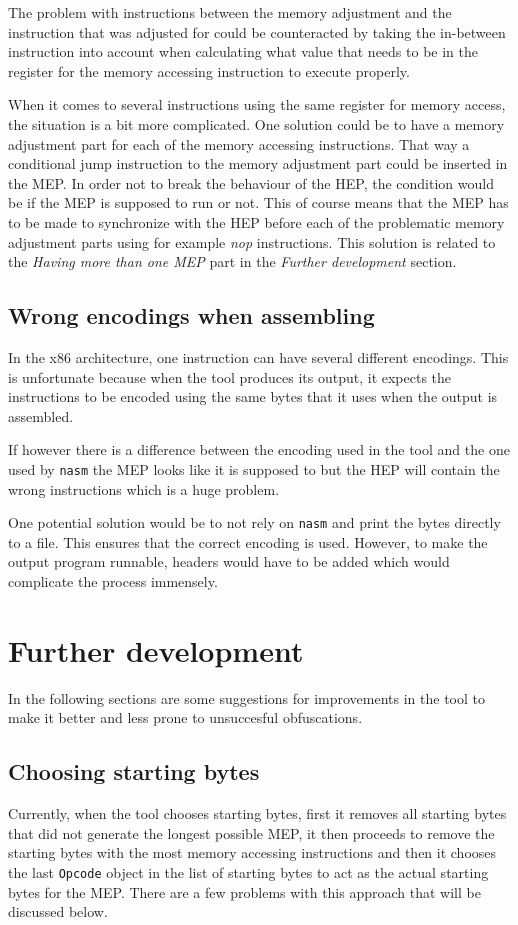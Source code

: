 \documentclass[11pt,twoside]{eitExjobb}
\begin{document}
The problem with instructions between the memory adjustment and the instruction that was adjusted for could be counteracted by taking the in-between instruction into account when calculating what value that needs to be in the register for the memory accessing instruction to execute properly. 

When it comes to several instructions using the same register for memory access, the situation is a bit more complicated. One solution could be to have a memory adjustment part for each of the memory accessing instructions. That way a conditional jump instruction to the memory adjustment part could be inserted in the MEP. In order not to break the behaviour of the HEP, the condition would be if the MEP is supposed to run or not. This of course means that the MEP has to be made to synchronize with the HEP before each of the problematic memory adjustment parts using for example \emph{nop} instructions. This solution is related to the \emph{Having more than one MEP} part in the \emph{Further development} section. 

\subsection{Wrong encodings when assembling}
In the x86 architecture, one instruction can have several different encodings. This is unfortunate because when the tool produces its output, it expects the instructions to be encoded using the same bytes that it uses when the output is assembled. 

If however there is a difference between the encoding used in the tool and the one used by \texttt{nasm} the MEP looks like it is supposed to but the HEP will contain the wrong instructions which is a huge problem.

One potential solution would be to not rely on \texttt{nasm} and print the bytes directly to a file. This ensures that the correct encoding is used. However, to make the output program runnable, headers would have to be added which would complicate the process immensely. 

\section{Further development}
In the following sections are some suggestions for improvements in the tool to make it better and less prone to unsuccesful obfuscations.

\subsection{Choosing starting bytes}
Currently, when the tool chooses starting bytes, first it removes all starting bytes that did not generate the longest possible MEP, it then proceeds to remove the starting bytes with the most memory accessing instructions and then it chooses the last \texttt{Opcode} object in the list of starting bytes to act as the actual starting bytes for the MEP. There are a few problems with this approach that will be discussed below.
\end{document}
